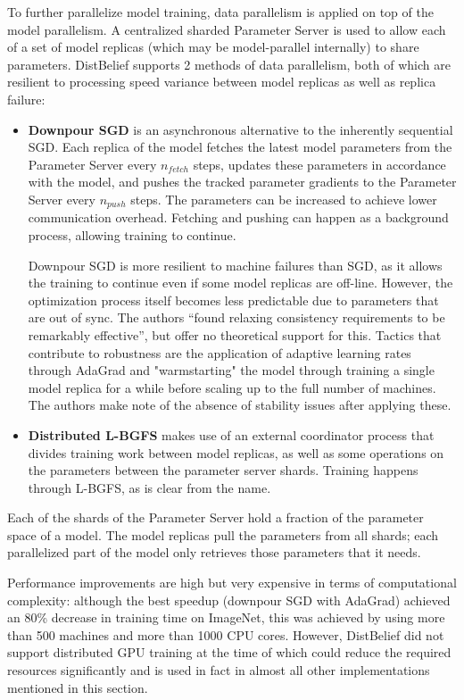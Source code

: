 To further parallelize model training, data parallelism is applied on top of the model parallelism. A centralized sharded Parameter Server is used to allow each of a set of model replicas (which may  be model-parallel internally) to share parameters. DistBelief supports 2 methods of data parallelism, both of which are resilient to processing speed variance between model replicas as well as replica failure:
\begin{itemize}
	\item \textbf{Downpour SGD} is an asynchronous alternative to the inherently sequential SGD. Each replica of the model fetches the latest model parameters from the Parameter Server every $n_{fetch}$ steps, updates these parameters in accordance with the model, and pushes the tracked parameter gradients to the Parameter Server every $n_{push}$ steps. The parameters can be increased to achieve lower communication overhead. Fetching and pushing can happen as a background process, allowing training to continue.
	
	Downpour SGD is more resilient to machine failures than SGD, as it allows the training to continue even if some model replicas are off-line. However, the optimization process itself becomes less predictable due to parameters that are out of sync. The authors “found relaxing consistency requirements to be remarkably effective”, but offer no theoretical support for this. Tactics that contribute to robustness are the application of adaptive learning rates through AdaGrad\citep{Duchi2011} and "warmstarting" the model through training a single model replica for a while before scaling up to the full number of machines. The authors make note of the absence of stability issues after applying these.
	\item \textbf{Distributed L-BGFS} makes use of an external coordinator process that divides training work between model replicas, as well as some operations on the parameters between the parameter server shards. Training happens through L-BGFS, as is clear from the name.
\end{itemize}
	
Each of the shards of the Parameter Server hold a fraction of the parameter space of a model. The model replicas pull the parameters from all shards; each parallelized part of the model only retrieves those parameters that it needs.

Performance improvements are high but very expensive in terms of computational complexity: although the best speedup (downpour SGD with AdaGrad) achieved an 80\% decrease in training time on ImageNet, this was achieved by using more than 500 machines and more than 1000 CPU cores. However, DistBelief did not support distributed GPU training at the time of \citet{DistBelief2012} which could reduce the required resources significantly and is used in fact in almost all other implementations mentioned in this section.

